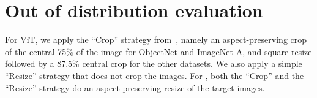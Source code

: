\section{Out of distribution evaluation}
\label{app:ood}

For ViT, we apply the ``Crop'' strategy from~\citep{dehghani2023scaling}, namely an aspect-preserving crop of the central 75\% of the image for ObjectNet and ImageNet-A, and square resize followed by a 87.5\% central crop for the other datasets. We also apply a simple ``Resize'' strategy that does not crop the images. For \navit, both the ``Crop'' and the ``Resize'' strategy do an aspect preserving resize of the target images.


